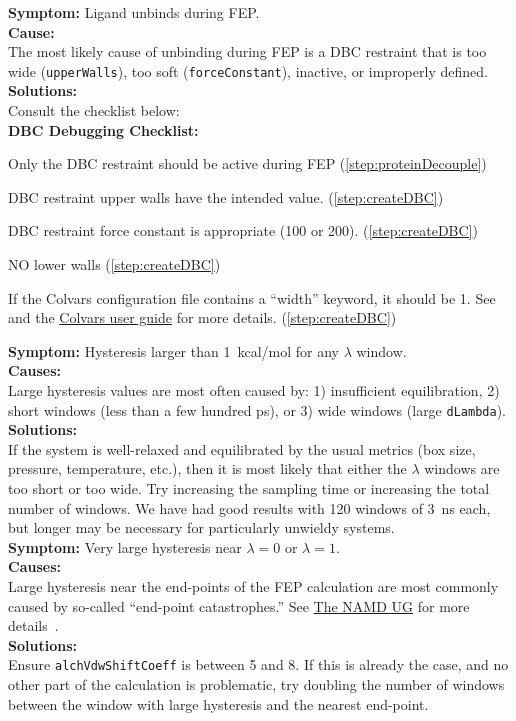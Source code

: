 \documentclass[9pt,tutorial,pubversion]{Styling/livecoms}
\newcommand{\textInput}[1]{\texttt{#1}}
\begin{document}
\noindent\textbf{Symptom:} Ligand unbinds during FEP.\\
\textbf{Cause:}\\
The most likely cause of unbinding during FEP is a DBC restraint that is too wide (\textInput{upperWalls}), too soft (\textInput{forceConstant}), inactive, or improperly defined.\\
\textbf{Solutions:}\\
 Consult the checklist below:\\

\textbf{DBC Debugging Checklist:}
\label{list:DBCdebug}
\begin{todolist} 
    \item Only the DBC restraint should be active during FEP (\ref{step:proteinDecouple})
    \item DBC restraint upper walls have the intended value. (\ref{step:createDBC})
    \item DBC restraint force constant is appropriate (100 or 200). (\ref{step:createDBC})
    \item NO lower walls (\ref{step:createDBC})
    \item If the Colvars configuration file contains a ``width'' keyword, it should be 1. See~\cite{Fiorin2013} and the \href{http://colvars.github.io/colvars-refman-vmd/colvars-refman-vmd.html#sec:colvar_grid_params}{Colvars user guide} for more details. (\ref{step:createDBC})
\end{todolist}


\noindent\textbf{Symptom:} Hysteresis larger than 1~kcal/mol for any $\lambda$ window.\\
\textbf{Causes:}\\
Large hysteresis values are most often caused by: 1) insufficient equilibration, 2) short windows (less than a few hundred ps), or 3) wide windows (large \textInput{dLambda}).\\
\textbf{Solutions:}\\
If the system is well-relaxed and equilibrated by the usual metrics (box size, pressure, temperature, etc.), then it is most likely that either the $\lambda$ windows are too short or too wide. Try increasing the sampling time or increasing the total number of windows. We have had good results with 120 windows of 3~ns each, but longer may be necessary for particularly unwieldy systems.\\

\noindent\textbf{Symptom:}  Very large hysteresis near $\lambda=0$ or $\lambda=1$.\\
\textbf{Causes:}\\
Large hysteresis near the end-points of the FEP calculation are most commonly caused by so-called ``end-point catastrophes.'' See \href{https://www.ks.uiuc.edu/Research/namd/2.14/ug/node63.html}{The NAMD UG} for more details~\cite{Bernardi2020}.\\  
\textbf{Solutions:}\\
Ensure \textInput{alchVdwShiftCoeff} is between 5 and 8. If this is already the case, and no other part of the calculation is problematic, try doubling the number of windows between the window with large hysteresis and the nearest end-point.\\
\end{document}

